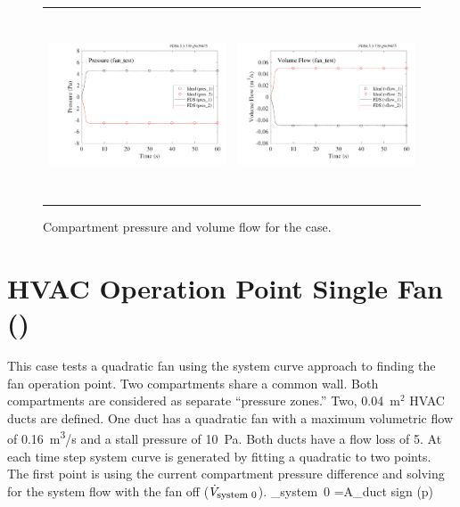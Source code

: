 \documentclass[11pt]{book}
\begin{document}
\begin{figure}[ht]
\begin{tabular*}{\textwidth}{lr}
\includegraphics[height=2.2in]{SCRIPT_FIGURES/fan_test_Pressure} &
\includegraphics[height=2.2in]{SCRIPT_FIGURES/fan_test_Volume_Flow}
\end{tabular*}
\caption[Results of the  case]{Compartment pressure and volume flow for the  case.}
\label{fan_test_fig}
\end{figure}

\section{HVAC Operation Point Single Fan (\texorpdfstring{}{qfan\_test})}
\label{qfan_test}

This case tests a quadratic fan using the system curve approach to finding the fan operation point. Two compartments share a common wall. Both compartments are considered as separate ``pressure zones.'' Two, 0.04~m$^2$ HVAC ducts are defined.  One duct has a quadratic fan with a maximum volumetric flow of 0.16~\si{m^3/s} and a stall pressure of 10~Pa. Both ducts have a flow loss of 5. At each time step system curve is generated by fitting a quadratic to two points. The first point is using the current compartment pressure difference and solving for the system flow with the fan off ($\dot{V}_{\hbox{\footnotesize system 0}}$).
\be
{}_{\hbox{\footnotesize system 0}} =A_{\hbox{\footnotesize duct}} \hbox{sign} (\Delta p) 
\ee
\end{document}
